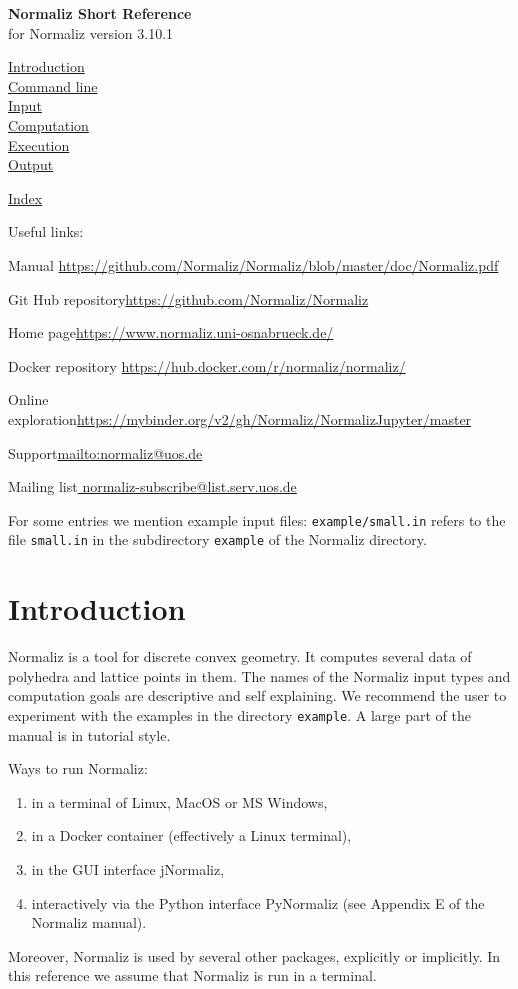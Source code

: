 \documentclass[12pt,a4paper]{scrartcl}
\theoremstyle{definition}
\def\ttt{\texttt}
\def\version{3.10.1}
\def\ContLine#1{\hyperref[#1]{\large #1}\\[6pt]}
\def\SectStart#1{\section{#1}\label{#1}\def\SectHead{#1}}
\def\example#1{\enspace\ttt{\color{blue}example/#1.in}}
\begin{document}
\vspace*{2cm}


\label{Top}
\begin{center}
\Large\textbf{Normaliz Short Reference}\\[12pt] for Normaliz version \version
\end{center}

\ContLine{Introduction}
\ContLine{Command line}
\ContLine{Input}
\ContLine{Computation}
\ContLine{Execution}
\ContLine{Output}
\medskip

\ContLine{Index}

\bigskip

Useful links:\medskip

Manual \enspace \url{https://github.com/Normaliz/Normaliz/blob/master/doc/Normaliz.pdf}\smallskip

Git Hub repository\enspace \url{https://github.com/Normaliz/Normaliz}\smallskip

Home page\enspace \url{https://www.normaliz.uni-osnabrueck.de/}\smallskip

Docker repository \url{https://hub.docker.com/r/normaliz/normaliz/}\smallskip

Online exploration\enspace	\url{https://mybinder.org/v2/gh/Normaliz/NormalizJupyter/master}\smallskip

Support\enspace 	\url{mailto:normaliz@uos.de} \smallskip

Mailing list\enspace \url{ normaliz-subscribe@list.serv.uos.de}

\bigskip\bigskip

For some entries we mention example input files: \example{small} refers to the file \verb|small.in| in the subdirectory \verb|example| of the Normaliz directory.

\newpage

\SectStart{Introduction}

Normaliz is a tool for discrete convex geometry. It computes several data of polyhedra and lattice points in them. The names of the Normaliz input types and computation goals are descriptive and self explaining. We recommend the user to experiment with the examples in  the directory \verb|example|. A large part of the manual is in tutorial style.

Ways to run Normaliz:
\begin{enumerate}
\item in a terminal of Linux, MacOS or MS Windows,
\item in a Docker container (effectively a Linux terminal),
\item in the GUI interface jNormaliz,
\item interactively via the Python interface PyNormaliz (see Appendix E of the Normaliz manual).
\end{enumerate}
Moreover, Normaliz is used by several other packages, explicitly or implicitly. In this reference we assume that Normaliz is run in a terminal.
\end{document}
